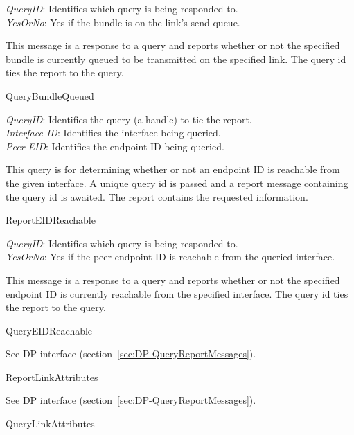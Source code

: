 {
\metP
    {\em QueryID}: Identifies which query is being responded to.\\
    {\em YesOrNo}: Yes if the bundle is on the link's send queue.

\metD
    This message is a response to a query and reports whether or not the
    specified bundle is currently queued to be transmitted on the specified
    link. The query id ties the report to the query. 

\metR
    QueryBundleQueued
}

{
\metP
    {\em QueryID}: Identifies the query (a handle) to tie the report.\\
    {\em Interface ID}: Identifies the interface being queried.\\
    {\em Peer EID}: Identifies the endpoint ID being queried.

\metD
    This query is for determining whether or not an endpoint ID is reachable
    from the given interface. A unique query id is passed and a
    report message containing the query id is awaited. The report contains
    the requested information.

\metR
    ReportEIDReachable
}

{
\metP
    {\em QueryID}: Identifies which query is being responded to.\\
    {\em YesOrNo}: Yes if the peer endpoint ID is reachable from the queried
    interface.

\metD
    This message is a response to a query and reports whether or not the
    specified endpoint ID is currently reachable from the specified interface.
    The query id ties the report to the query. 

\metR
    QueryEIDReachable
}

{
\metD
    See DP interface (section~\ref{sec:DP-QueryReportMessages}).
    
\metR
    ReportLinkAttributes
}

{
\metD
    See DP interface (section~\ref{sec:DP-QueryReportMessages}).

\metR
    QueryLinkAttributes
}


